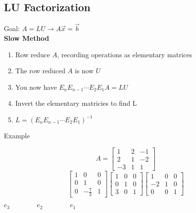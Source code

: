 \documentclass[10pt]{article}
\begin{document}
\pagebreak

\begin{multicols}{2}
    \begin{minipage}{\columnwidth}
    \subsection*{LU Factorization}
    Goal: \(A = LU \rightarrow A\overrightarrow{x} = \overrightarrow{b} \) \\
    \textbf{Slow Method}
    \begin{enumerate}
        \item Row reduce \(A\), recording operations as elementary matrices
        \item The row reduced \(A\) is now \(U\)
        \item You now have \(E_n E_{n-1} \cdots E_2 E_1 A = LU\)
        \item Invert the elementary matricies to find L
        \item \(L = (E_n E_{n-1} \cdots E_2 E_1) ^ {-1}\)
    \end{enumerate}

    Example
    \begin{minipage}{0.5\linewidth}
        \[
            A = \begin{bmatrix}
                1 & 2 & -1 \\
                2 & 1 & -2 \\
                -3 & 1 & 1
            \end{bmatrix}
        \]
        \[
                \begin{bmatrix}
                    1 & 0 & 0 \\
                    0 & 1 & 0 \\
                    0 & -\frac{7}{3} & 1
                \end{bmatrix}
                \begin{bmatrix}
                    1 & 0 & 0 \\
                    0 & 1 & 0 \\
                    3 & 0 & 1
                \end{bmatrix}
                \begin{bmatrix}
                    1 & 0 & 0 \\
                    -2 & 1 & 0 \\
                    0 & 0 & 1
                \end{bmatrix}
        \]
        \begin{center}  
            \(e_3 \quad\quad\quad\quad e_2 \quad\quad\quad\quad e_1\)
        \end{center}


\end{minipage}
\end{minipage}
\end{multicols}
\end{document}
